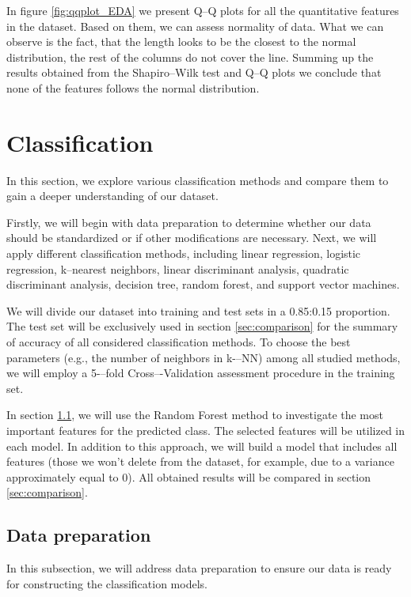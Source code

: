 \documentclass[11pt,a4paper]{article}\usepackage[]{graphicx}\usepackage[]{xcolor}
\begin{document}
In figure \ref{fig:qqplot_EDA} we present Q--Q plots for all the quantitative features in the dataset. Based on them, we can assess normality of data. What we can observe is the fact, that the length looks to be the closest to the normal distribution, the rest of the columns do not cover the line. Summing up the results obtained from the Shapiro--Wilk test and Q--Q plots we conclude that none of the features follows the normal distribution.
	

	



	
	\section{Classification}\label{sec:classification}
In this section, we explore various classification methods and compare them to gain a deeper understanding of our dataset.
	
Firstly, we will begin with data preparation to determine whether our data should be standardized or if other modifications are necessary. Next, we will apply different classification methods, including linear regression, logistic regression, k–nearest neighbors, linear discriminant analysis, quadratic discriminant analysis, decision tree, random forest, and support vector machines.
	
	We will divide our dataset into training and test sets in a 0.85:0.15 proportion. The test set will be exclusively used in section \ref{sec:comparison} for the summary of accuracy of all considered classification methods. To choose the best parameters (e.g., the number of neighbors in k-–NN) among all studied methods, we will employ a 5-–fold Cross–-Validation assessment procedure in the training set.
	
	In section \ref{sec:data_preparation}, we will use the Random Forest method to investigate the most important features for the predicted class. The selected features will be utilized in each model. In addition to this approach, we will build a model that includes all features (those we won't delete from the dataset, for example, due to a variance approximately equal to 0). All obtained results will be compared in section \ref{sec:comparison}.
	


	\subsection{Data preparation}\label{sec:data_preparation}
	In this subsection, we will address data preparation to ensure our data is ready for constructing the classification models.
	
\end{document}
